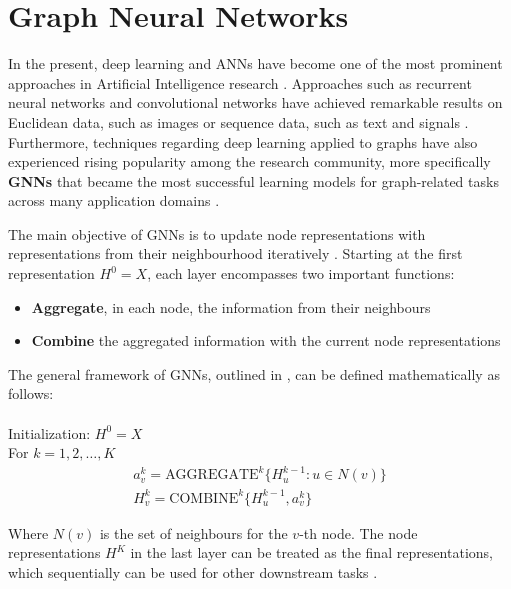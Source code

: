 \section{Graph Neural Networks} \label{sec:back-gnn}
 

In the present, deep learning and \acp{ANN} have become one of the most prominent approaches in Artificial Intelligence research \cite{cuiGraphRepresentationLearning2022}. Approaches such as recurrent neural networks and convolutional networks have achieved remarkable results on Euclidean data, such as images or sequence data, such as text and signals \cite{wuGraphNeuralNetworks2022a}. Furthermore, techniques regarding deep learning applied to graphs have also experienced rising popularity among the research community, more specifically \textbf{\acfp{GNN}} that became the most successful learning models for graph-related tasks across many application domains \cite{cuiGraphRepresentationLearning2022, wuGraphNeuralNetworks2022a}. \par

The main objective of \acp{GNN} is to update node representations with representations from their neighbourhood iteratively \cite{tangGraphNeuralNetworks2022}. Starting at the first representation $H^0 = X$, each layer encompasses two important functions:
\begin{itemize}
	\item \textbf{Aggregate}, in each node, the information from their neighbours
	\item \textbf{Combine} the aggregated information with the current node representations
\end{itemize}

The general framework of \acp{GNN}, outlined in \cite{tangGraphNeuralNetworks2022}, can be defined mathematically as follows: \\ \\
Initialization: $H^0 = X$ \\
For $k = 1, 2, \dots, K$
\begin{gather*}
	a^k_v = \text{AGGREGATE}^k\{H^{k-1}_u : u \in N(v)\} \\
	H^k_v = \text{COMBINE}^k\{H^{k-1}_u, a^k_v\}       
\end{gather*}

Where $N(v)$ is the set of neighbours for the $v$-th node. The node representations $H^K$ in the last layer can be treated as the final representations, which sequentially can be used for other downstream tasks \cite{tangGraphNeuralNetworks2022}.


